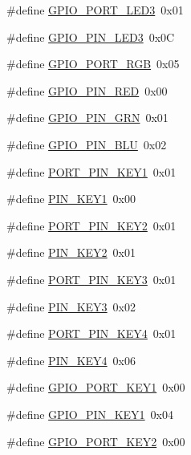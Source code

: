 \begin{DoxyCompactItemize}
\#define \hyperlink{group__hardware_ga8b63f7f606f2b1ec7d88205ee6c514ea}{G\+P\+I\+O\+\_\+\+P\+O\+R\+T\+\_\+\+L\+E\+D3}~0x01
\item 
\#define \hyperlink{group__hardware_ga9e7e83187eae26d02136f609392fabd0}{G\+P\+I\+O\+\_\+\+P\+I\+N\+\_\+\+L\+E\+D3}~0x0C
\item 
\#define \hyperlink{group__hardware_ga9e2ed2756af597d0ec2ee618ef235c7e}{G\+P\+I\+O\+\_\+\+P\+O\+R\+T\+\_\+\+R\+GB}~0x05
\item 
\#define \hyperlink{group__hardware_gaa4aae4b49bb53e52b78b530637dcd2d7}{G\+P\+I\+O\+\_\+\+P\+I\+N\+\_\+\+R\+ED}~0x00
\item 
\#define \hyperlink{group__hardware_ga8ce252c71154210c65808a2170d74223}{G\+P\+I\+O\+\_\+\+P\+I\+N\+\_\+\+G\+RN}~0x01
\item 
\#define \hyperlink{group__hardware_ga2aa9b3c113e9f52a2e04ff811b8ec518}{G\+P\+I\+O\+\_\+\+P\+I\+N\+\_\+\+B\+LU}~0x02
\item 
\#define \hyperlink{group__hardware_gafe1bf3da61040955deda9703ee539687}{P\+O\+R\+T\+\_\+\+P\+I\+N\+\_\+\+K\+E\+Y1}~0x01
\item 
\#define \hyperlink{group__hardware_ga332cf72d49bf86b7b20274f3dec99d7b}{P\+I\+N\+\_\+\+K\+E\+Y1}~0x00
\item 
\#define \hyperlink{group__hardware_ga2cc4114181749a25732e31ed271a1f6b}{P\+O\+R\+T\+\_\+\+P\+I\+N\+\_\+\+K\+E\+Y2}~0x01
\item 
\#define \hyperlink{group__hardware_gae87128e49906c97fa9d6b438a08c1221}{P\+I\+N\+\_\+\+K\+E\+Y2}~0x01
\item 
\#define \hyperlink{group__hardware_ga5f697895be4580f403de4a9f75ab8a3b}{P\+O\+R\+T\+\_\+\+P\+I\+N\+\_\+\+K\+E\+Y3}~0x01
\item 
\#define \hyperlink{group__hardware_gaec621d9712815696a7bd342db8b2ff06}{P\+I\+N\+\_\+\+K\+E\+Y3}~0x02
\item 
\#define \hyperlink{group__hardware_gac86eb82e082d51cc0d4b0a87680cd7da}{P\+O\+R\+T\+\_\+\+P\+I\+N\+\_\+\+K\+E\+Y4}~0x01
\item 
\#define \hyperlink{group__hardware_gaf59a027359301b6e2229f7068c36efe6}{P\+I\+N\+\_\+\+K\+E\+Y4}~0x06
\item 
\#define \hyperlink{group__hardware_gabce59bc33538c850842e408765ae4981}{G\+P\+I\+O\+\_\+\+P\+O\+R\+T\+\_\+\+K\+E\+Y1}~0x00
\item 
\#define \hyperlink{group__hardware_ga26fa1a6916e027dcfa2d5a76c18dccb4}{G\+P\+I\+O\+\_\+\+P\+I\+N\+\_\+\+K\+E\+Y1}~0x04
\item 
\#define \hyperlink{group__hardware_gaeaf62bdfcf5fc1fe75d98d961286be78}{G\+P\+I\+O\+\_\+\+P\+O\+R\+T\+\_\+\+K\+E\+Y2}~0x00

\end{DoxyCompactItemize}
